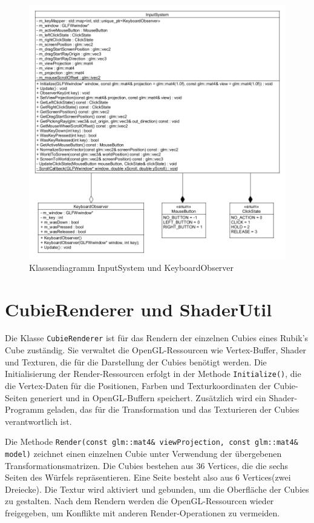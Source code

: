 \begin{figure} [H]
	\centering
	\includegraphics[scale=0.475]{images/InputSystemClassDia.png}
	\caption{Klassendiagramm InputSystem und KeyboardObserver}
	\label{InputSystemDia}
\end{figure}
\newpage
\section{CubieRenderer und ShaderUtil}
Die Klasse \texttt{CubieRenderer} ist für das Rendern der einzelnen Cubies eines Rubik's Cube zuständig. Sie verwaltet die OpenGL-Ressourcen wie Vertex-Buffer, Shader und Texturen, die für die Darstellung der Cubies benötigt werden. Die Initialisierung der Render-Ressourcen erfolgt in der Methode \texttt{Initialize()}, die die Vertex-Daten für die Positionen, Farben und Texturkoordinaten der Cubie-Seiten generiert und in OpenGL-Buffern speichert. Zusätzlich wird ein Shader-Programm geladen, das für die Transformation und das Texturieren der Cubies verantwortlich ist.

Die Methode \texttt{Render(const glm::mat4\& viewProjection, const glm::mat4\& model)} zeichnet einen einzelnen Cubie unter Verwendung der übergebenen Transformationsmatrizen. Die Cubies bestehen aus 36 Vertices, die die sechs Seiten des Würfels repräsentieren. Eine Seite besteht also aus 6 Vertices(zwei Dreiecke). Die Textur wird aktiviert und gebunden, um die Oberfläche der Cubies zu gestalten. Nach dem Rendern werden die OpenGL-Ressourcen wieder freigegeben, um Konflikte mit anderen Render-Operationen zu vermeiden.

